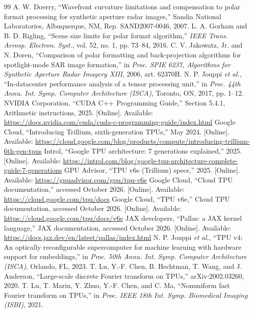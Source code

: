 \documentclass[11pt]{article}
\begin{document}
\begin{thebibliography}{99}
 A. W. Doerry, ``Wavefront curvature limitations and compensation to polar format processing for synthetic aperture radar images,'' Sandia National Laboratories, Albuquerque, NM, Rep. SAND2007-0046, 2007.
 L. A. Gorham and B. D. Rigling, ``Scene size limits for polar format algorithm,'' \emph{IEEE Trans. Aerosp. Electron. Syst.}, vol. 52, no. 1, pp. 73--84, 2016.
 C. V. Jakowatz, Jr. and N. Doren, ``Comparison of polar formatting and back-projection algorithms for spotlight-mode SAR image formation,'' in \emph{Proc. SPIE 6237, Algorithms for Synthetic Aperture Radar Imagery XIII}, 2006, art. 62370H.
 N. P. Jouppi \emph{et al.}, ``In-datacenter performance analysis of a tensor processing unit,'' in \emph{Proc. 44th Annu. Int. Symp. Computer Architecture (ISCA)}, Toronto, ON, 2017, pp. 1--12.
 NVIDIA Corporation, ``CUDA C++ Programming Guide,'' Section 5.4.1, Arithmetic instructions, 2025. [Online]. Available: \url{https://docs.nvidia.com/cuda/cuda-c-programming-guide/index.html}
 Google Cloud, ``Introducing Trillium, sixth-generation TPUs,'' May 2024. [Online]. Available: \url{https://cloud.google.com/blog/products/compute/introducing-trillium-6th-gen-tpus}
 Introl, ``Google TPU architecture: 7 generations explained,'' 2025. [Online]. Available: \url{https://introl.com/blog/google-tpu-architecture-complete-guide-7-generations}
 GPU Advisor, ``TPU v6e (Trillium) specs,'' 2025. [Online]. Available: \url{https://gpuadvisor.com/gpu/tpu-v6e}
 Google Cloud, ``Cloud TPU documentation,'' accessed October 2026. [Online]. Available: \url{https://cloud.google.com/tpu/docs}
 Google Cloud, ``TPU v6e,'' Cloud TPU documentation, accessed October 2026. [Online]. Available: \url{https://cloud.google.com/tpu/docs/v6e}
 JAX developers, ``Pallas: a JAX kernel language,'' JAX documentation, accessed October 2026. [Online]. Available: \url{https://docs.jax.dev/en/latest/pallas/index.html}
 N. P. Jouppi \emph{et al.}, ``TPU v4: An optically reconfigurable supercomputer for machine learning with hardware support for embeddings,'' in \emph{Proc. 50th Annu. Int. Symp. Computer Architecture (ISCA)}, Orlando, FL, 2023.
 T. Lu, Y.-F. Chen, B. Hechtman, T. Wang, and J. Anderson, ``Large-scale discrete Fourier transform on TPUs,'' arXiv:2002.03260, 2020.
 T. Lu, T. Marin, Y. Zhuo, Y.-F. Chen, and C. Ma, ``Nonuniform fast Fourier transform on TPUs,'' in \emph{Proc. IEEE 18th Int. Symp. Biomedical Imaging (ISBI)}, 2021.

\end{thebibliography}
\end{document}
